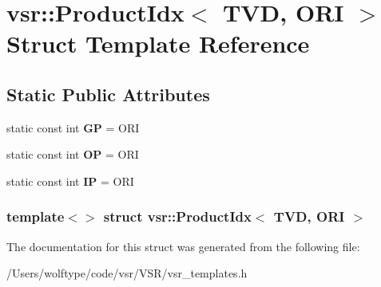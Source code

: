 \hypertarget{structvsr_1_1_product_idx_3_01_t_v_d_00_01_o_r_i_01_4}{\section{vsr\-:\-:Product\-Idx$<$ T\-V\-D, O\-R\-I $>$ Struct Template Reference}
\label{structvsr_1_1_product_idx_3_01_t_v_d_00_01_o_r_i_01_4}
}
\subsection*{Static Public Attributes}
\begin{DoxyCompactItemize}
\item 
\hypertarget{structvsr_1_1_product_idx_3_01_t_v_d_00_01_o_r_i_01_4_a66fd5d2e1a6265e9069f63ba24d7c822}{static const int {\bfseries G\-P} = O\-R\-I}\label{structvsr_1_1_product_idx_3_01_t_v_d_00_01_o_r_i_01_4_a66fd5d2e1a6265e9069f63ba24d7c822}

\item 
\hypertarget{structvsr_1_1_product_idx_3_01_t_v_d_00_01_o_r_i_01_4_aa344b79de04395bb02056fcac8a61619}{static const int {\bfseries O\-P} = O\-R\-I}\label{structvsr_1_1_product_idx_3_01_t_v_d_00_01_o_r_i_01_4_aa344b79de04395bb02056fcac8a61619}

\item 
\hypertarget{structvsr_1_1_product_idx_3_01_t_v_d_00_01_o_r_i_01_4_afd275c082666f964cc0fa60eba1fc7a9}{static const int {\bfseries I\-P} = O\-R\-I}\label{structvsr_1_1_product_idx_3_01_t_v_d_00_01_o_r_i_01_4_afd275c082666f964cc0fa60eba1fc7a9}

\end{DoxyCompactItemize}
\subsubsection*{template$<$$>$ struct vsr\-::\-Product\-Idx$<$ T\-V\-D, O\-R\-I $>$}



The documentation for this struct was generated from the following file\-:\begin{DoxyCompactItemize}
\item 
/\-Users/wolftype/code/vsr/\-V\-S\-R/vsr\-\_\-templates.\-h\end{DoxyCompactItemize}

